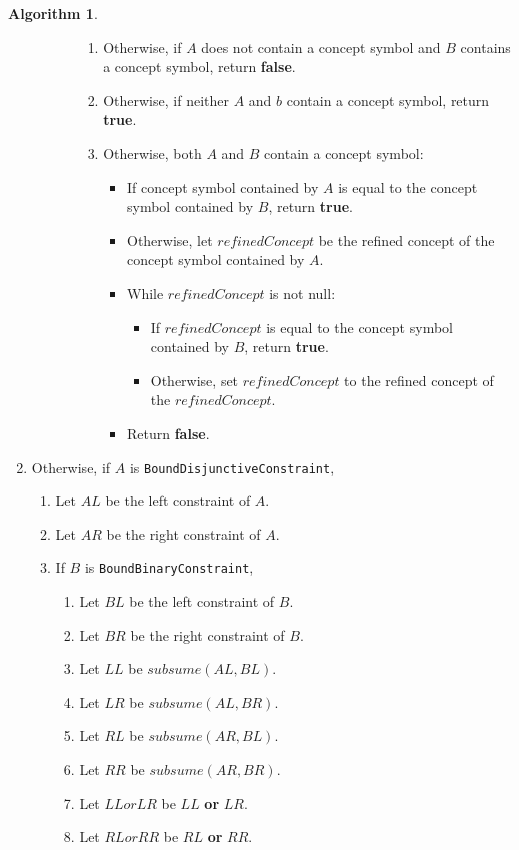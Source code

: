 \documentclass[a4paper,oneside,11pt]{book}
\theoremstyle{definition}
\newtheorem{algo}{Algorithm}[section]
\begin{document}
\begin{algo}
\begin{enumerate}
\begin{enumerate}
\begin{enumerate}
\begin{enumerate}
\item
Otherwise, if $A$ does not contain a concept symbol and $B$ contains a concept symbol, return \textbf{false}.
\item
Otherwise, if neither $A$ and $b$ contain a concept symbol, return \textbf{true}.
\item
Otherwise, both $A$ and $B$ contain a concept symbol:
\begin{itemize}
\item
If concept symbol contained by $A$ is equal to the concept symbol contained by $B$, return \textbf{true}.
\item
Otherwise, let $refinedConcept$ be the refined concept of the concept symbol contained by $A$.
\item
While $refinedConcept$ is not null:
\begin{itemize}
\item
If $refinedConcept$ is equal to the concept symbol contained by $B$, return \textbf{true}.
\item
Otherwise, set $refinedConcept$ to the refined concept of the $refinedConcept$.
\end{itemize}
\item
Return \textbf{false}.
\end{itemize}
\end{enumerate}
\end{enumerate}
\end{enumerate}
\item
Otherwise, if $A$ is \verb|BoundDisjunctiveConstraint|,
\begin{enumerate}
\item
Let $AL$ be the left constraint of $A$.
\item
Let $AR$ be the right constraint of $A$.
\item
If $B$ is \verb|BoundBinaryConstraint|,
\begin{enumerate}
\item
Let $BL$ be the left constraint of $B$.
\item
Let $BR$ be the right constraint of $B$.
\item
Let $LL$ be $subsume(AL, BL)$.
\item
Let $LR$ be $subsume(AL, BR)$.
\item
Let $RL$ be $subsume(AR, BL)$.
\item
Let $RR$ be $subsume(AR, BR)$.
\item
Let $LLorLR$ be $LL$ \textbf{or} $LR$.
\item
Let $RLorRR$ be $RL$ \textbf{or} $RR$.

\end{enumerate}
\end{enumerate}
\end{enumerate}
\end{algo}
\end{document}
